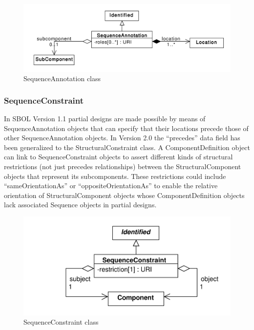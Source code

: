 \documentclass[draftspec]{sbmlpkgspec}
\begin{document}
\begin{figure}[ht]
\begin{center}
\includegraphics[scale=0.6]{uml/sequence_annotation}
\caption[]{SequenceAnnotation class}
\label{uml:sequence_annotation}
\end{center}
\end{figure}




\subsubsection{SequenceConstraint}
\label{sec:SequenceConstraint}
In SBOL Version 1.1 partial designs are made possible by means of SequenceAnnotation objects that can specify that their locations precede those of other SequenceAnnotation objects. In Version 2.0 the “precedes” data field has been generalized to the StructuralConstraint class. A ComponentDefinition object can link to SequenceConstraint objects to assert different kinds of structural restrictions (not just precedes relationships) between the StructuralComponent objects that represent its subcomponents. These restrictions could include “sameOrientationAs” or “oppositeOrientationAs” to enable the relative orientation of StructuralComponent objects whose ComponentDefinition objects lack associated Sequence objects in partial designs.

\begin{figure}[ht]
\begin{center}
\includegraphics[scale=0.6]{uml/sequence_constraint}
\caption[]{SequenceConstraint class}
\label{uml:sequence_constraint}
\end{center}
\end{figure}
\end{document}
